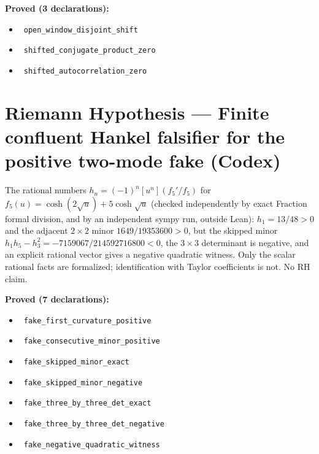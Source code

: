 \documentclass{report}
\theoremstyle{definition}
\begin{document}
\begin{itemize}
\noindent\textbf{Proved (3 declarations):}
\begin{itemize}
  \item {}\leanok\ \texttt{open\_window\_disjoint\_shift}
  \item {}\leanok\ \texttt{shifted\_conjugate\_product\_zero}
  \item {}\leanok\ \texttt{shifted\_autocorrelation\_zero}
\end{itemize}

\section{Riemann Hypothesis --- Finite confluent Hankel falsifier for the positive two-mode fake (Codex)}
The rational numbers $h_n=(-1)^n[u^n](f_5'/f_5)$ for $f_5(u)=\cosh(2\sqrt u)+5\cosh\sqrt u$ (checked independently by exact Fraction formal division, and by an independent sympy run, outside Lean): $h_1=13/48>0$ and the adjacent $2\times2$ minor $1649/19353600>0$, but the skipped minor $h_1h_5-h_3^2=-7159067/214592716800<0$, the $3\times3$ determinant is negative, and an explicit rational vector gives a negative quadratic witness. Only the scalar rational facts are formalized; identification with Taylor coefficients is not. No RH claim.

\noindent\textbf{Proved (7 declarations):}
\begin{itemize}
  \item {}\leanok\ \texttt{fake\_first\_curvature\_positive}
  \item {}\leanok\ \texttt{fake\_consecutive\_minor\_positive}
  \item {}\leanok\ \texttt{fake\_skipped\_minor\_exact}
  \item {}\leanok\ \texttt{fake\_skipped\_minor\_negative}
  \item {}\leanok\ \texttt{fake\_three\_by\_three\_det\_exact}
  \item {}\leanok\ \texttt{fake\_three\_by\_three\_det\_negative}
  \item {}\leanok\ \texttt{fake\_negative\_quadratic\_witness}
\end{itemize}


\end{itemize}
\end{document}
